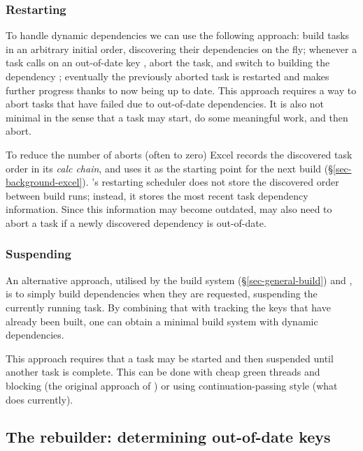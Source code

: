 \vspace{-2mm}
\subsubsection{Restarting}\label{sec-restarting}

To handle dynamic dependencies we can use the following approach:
build tasks in an arbitrary initial order, discovering their dependencies on the fly;
whenever a task calls  on an out-of-date key , abort the task,
and switch to building the dependency ; eventually the previously
aborted task is restarted and makes further progress thanks to  now
being up to date.
This approach requires a way to abort tasks that have failed due to out-of-date
dependencies. It is also not minimal in the sense that a task may start, do some
meaningful work, and then abort.

To reduce the number of aborts (often to zero) Excel records the
discovered task order in its \emph{calc chain}, and uses it as the
starting point for the next build (\S\ref{sec-background-excel}).
\Bazel's restarting scheduler does not store the discovered order
between build runs; instead, it stores the most recent task dependency
information. Since this information may become outdated, \Bazel may
also need to abort a task if a newly discovered dependency is
out-of-date.

\vspace{-2mm}
\subsubsection{Suspending}\label{sec-suspending}

An alternative approach, utilised by the  build system
(\S\ref{sec-general-build}) and \Shake, is to simply build dependencies when
they are requested, suspending the currently running task. By combining that
with tracking the keys that have already been built, one can obtain a minimal
build system with dynamic dependencies.

This approach requires that a task may be started and then suspended until
another task is complete. This can be done with cheap green threads and blocking
(the original approach of \Shake) or using continuation-passing style (what
\Shake does currently).

\subsection{The rebuilder: determining out-of-date keys} \label{sec-out-of-date}

